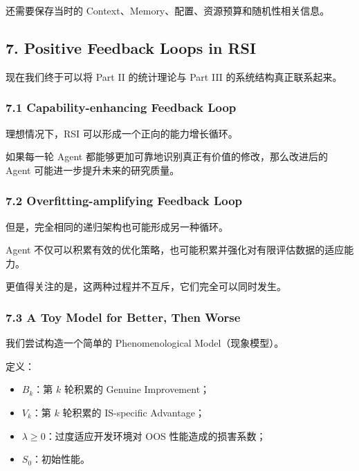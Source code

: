 还需要保存当时的 Context、Memory、配置、资源预算和随机性相关信息。

\hypertarget{part-3-37-0001-positive-feedback-loops-in-rsi}{%
\subsection{7. Positive Feedback Loops in RSI}\label{part-3-37-0001-positive-feedback-loops-in-rsi}}

现在我们终于可以将 Part II 的统计理论与 Part III 的系统结构真正联系起来。

\hypertarget{part-3-37-0001-capability-enhancing-feedback-loop}{%
\subsubsection{7.1 Capability-enhancing Feedback Loop}\label{part-3-37-0001-capability-enhancing-feedback-loop}}

理想情况下，RSI 可以形成一个正向的能力增长循环。


如果每一轮 Agent 都能够更加可靠地识别真正有价值的修改，那么改进后的 Agent 可能进一步提升未来的研究质量。

\hypertarget{part-3-37-0001-overfitting-amplifying-feedback-loop}{%
\subsubsection{7.2 Overfitting-amplifying Feedback Loop}\label{part-3-37-0001-overfitting-amplifying-feedback-loop}}

但是，完全相同的递归架构也可能形成另一种循环。


Agent 不仅可以积累有效的优化策略，也可能积累并强化对有限评估数据的适应能力。

更值得关注的是，这两种过程并不互斥，它们完全可以同时发生。

\hypertarget{part-3-37-0001-a-toy-model-for-better-then-worse}{%
\subsubsection{7.3 A Toy Model for Better, Then Worse}\label{part-3-37-0001-a-toy-model-for-better-then-worse}}

我们尝试构造一个简单的 Phenomenological Model（现象模型）。

定义：

\begin{itemize}
\tightlist
\item
  \(B_k\)：第 \(k\) 轮积累的 Genuine Improvement；
\item
  \(V_k\)：第 \(k\) 轮积累的 IS-specific Advantage；
\item
  \(\lambda\geq0\)：过度适应开发环境对 OOS 性能造成的损害系数；
\item
  \(S_0\)：初始性能。
\end{itemize}


